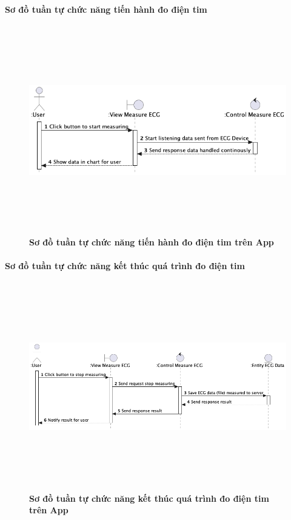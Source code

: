 \documentclass{article}%
\begin{document}
\paragraph{Sơ đồ tuần tự chức năng tiến hành đo điện tim}
\mbox{}

  \begin{figure}[H]
        \centering
        \includegraphics[width=16cm,height=9cm]{Images/mobile_app/start_measuring_ecg.png}
        \caption[Sơ đồ tuần tự chức năng tiến hành đo điện tim trên App]{\bfseries \fontsize{12pt}{0pt}
        \selectfont Sơ đồ tuần tự chức năng tiến hành đo điện tim trên App}
        \label{hinh21} %
  \end{figure}
 

\paragraph{Sơ đồ tuần tự chức năng kết thúc quá trình đo điện tim}
\mbox{}

  \begin{figure}[H]
        \centering
        \includegraphics[width=16cm,height=9cm]{Images/mobile_app/end_measuring_ecg.png}
        \caption[Sơ đồ tuần tự chức năng kết thúc quá trình đo điện tim trên App]{\bfseries \fontsize{12pt}{0pt}
        \selectfont Sơ đồ tuần tự chức năng kết thúc quá trình đo điện tim trên App}
        \label{hinh21} %
  \end{figure}
\end{document}
